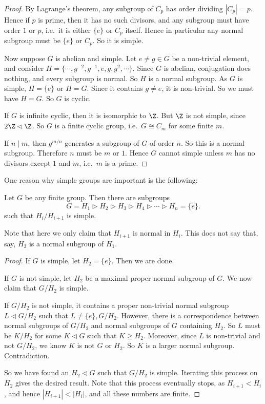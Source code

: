 \documentclass[a4paper]{article}
\begin{document}
\begin{proof}
  By Lagrange's theorem, any subgroup of $C_p$ has order dividing $|C_p| = p$. Hence if $p$ is prime, then it has no such divisors, and any subgroup must have order $1$ or $p$, i.e.\ it is either $\{e\}$ or $C_p$ itself. Hence in particular any normal subgroup must be $\{e\}$ or $C_p$. So it is simple.

  Now suppose $G$ is abelian and simple. Let $e \not= g \in G$ be a non-trivial element, and consider $H = \{\cdots, g^{-2}, g^{-1}, e, g, g^2, \cdots\}$. Since $G$ is abelian, conjugation does nothing, and every subgroup is normal. So $H$ is a normal subgroup. As $G$ is simple, $H = \{e\}$ or $H = G$. Since it contains $g \not= e$, it is non-trivial. So we must have $H = G$. So $G$ is cyclic.

  If $G$ is infinite cyclic, then it is isomorphic to $\Z$. But $\Z$ is not simple, since $2\Z \lhd \Z$. So $G$ is a finite cyclic group, i.e.\ $G \cong C_m$ for some finite $m$.

  If $n \mid m$, then $g^{m/n}$ generates a subgroup of $G$ of order $n$. So this is a normal subgroup. Therefore $n$ must be $m$ or $1$. Hence $G$ cannot simple unless $m$ has no divisors except $1$ and $m$, i.e.\ $m$ is a prime.
\end{proof}

One reason why simple groups are important is the following:
\begin{thm}
  Let $G$ be any finite group. Then there are subgroups
  \[
    G = H_1 \rhd H_2 \rhd H_3 \rhd H_4 \rhd \cdots \rhd H_n = \{e\}.
  \]
  such that $H_i/H_{i + 1}$ is simple.
\end{thm}
Note that here we only claim that $H_{i + 1}$ is normal in $H_i$. This does not say that, say, $H_3$ is a normal subgroup of $H_1$.

\begin{proof}
  If $G$ is simple, let $H_2 = \{e\}$. Then we are done.

  If $G$ is not simple, let $H_2$ be a maximal proper normal subgroup of $G$. We now claim that $G/H_2$ is simple.

  If $G/H_2$ is not simple, it contains a proper non-trivial normal subgroup $L \lhd G/H_2$ such that $L \not= \{e\}, G/H_2$. However, there is a correspondence between normal subgroups of $G/H_2$ and normal subgroups of $G$ containing $H_2$. So $L$ must be $K/H_2$ for some $K \lhd G$ such that $K \geq H_2$. Moreover, since $L$ is non-trivial and not $G/H_2$, we know $K$ is not $G$ or $H_2$. So $K$ is a larger normal subgroup. Contradiction.

  So we have found an $H_2 \lhd G$ such that $G/H_2$ is simple. Iterating this process on $H_2$ gives the desired result. Note that this process eventually stops, as $H_{i + 1} < H_i$, and hence $|H_{i + 1}| < |H_i|$, and all these numbers are finite.
\end{proof}
\end{document}
